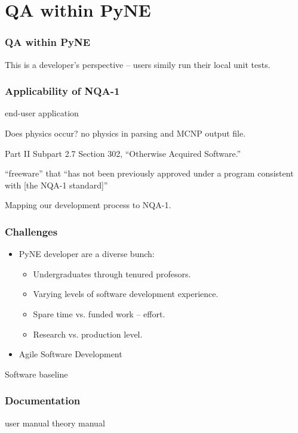\documentclass[12pt]{beamer}
\begin{document}
\section{QA within PyNE}

\begin{frame}
\frametitle{QA within PyNE}
This is a developer's perspective -- users simily run their local unit tests.
\end{frame}


\begin{frame}
\frametitle{Applicability of NQA-1}

end-user application

Does physics occur? no physics in parsing and MCNP output file.


Part II Subpart 2.7 Section 302, “Otherwise Acquired Software.”

“freeware” that “has not been previously
approved under a program consistent with [the NQA-1 standard]”

Mapping our development process to NQA-1.

\end{frame}


\begin{frame}[fragile]
\frametitle{Challenges}

\begin{itemize}
\item{PyNE developer are a diverse bunch}:
   \begin{itemize}
   \item{Undergraduates through tenured profesors.}
   \item{Varying levels of software development experience.}
   \item{Spare time vs. funded work -- effort.}
   \item{Research vs. production level.}
   \end{itemize}
\item{Agile Software Development \cite{larman2004agile}}
\end{itemize}

Software baseline
\end{frame}

\begin{frame}
\frametitle{Documentation}
user manual
theory manual
\end{frame}
\end{document}
